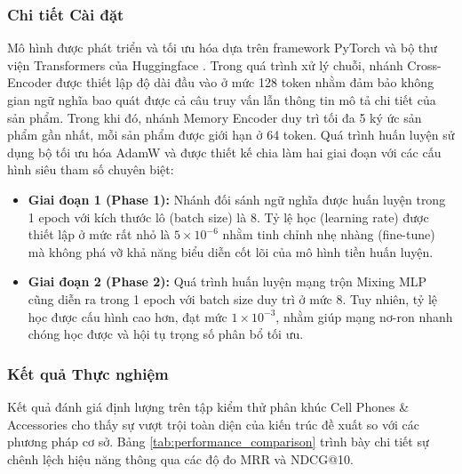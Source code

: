 \subsubsection*{Chi tiết Cài đặt}
Mô hình được phát triển và tối ưu hóa dựa trên framework PyTorch và bộ thư viện Transformers của Huggingface \cite{17}. Trong quá trình xử lý chuỗi, nhánh Cross-Encoder được thiết lập độ dài đầu vào ở mức 128 token nhằm đảm bảo không gian ngữ nghĩa bao quát được cả câu truy vấn lẫn thông tin mô tả chi tiết của sản phẩm. Trong khi đó, nhánh Memory Encoder duy trì tối đa 5 ký ức sản phẩm gần nhất, mỗi sản phẩm được giới hạn ở 64 token. Quá trình huấn luyện sử dụng bộ tối ưu hóa AdamW và được thiết kế chia làm hai giai đoạn với các cấu hình siêu tham số chuyên biệt:
\begin{itemize}
    \item \textbf{Giai đoạn 1 (Phase 1):} Nhánh đối sánh ngữ nghĩa được huấn luyện trong 1 epoch với kích thước lô (batch size) là 8. Tỷ lệ học (learning rate) được thiết lập ở mức rất nhỏ là $5 \times 10^{-6}$ nhằm tinh chỉnh nhẹ nhàng (fine-tune) mà không phá vỡ khả năng biểu diễn cốt lõi của mô hình tiền huấn luyện.
    \item \textbf{Giai đoạn 2 (Phase 2):} Quá trình huấn luyện mạng trộn Mixing MLP cũng diễn ra trong 1 epoch với batch size duy trì ở mức 8. Tuy nhiên, tỷ lệ học được cấu hình cao hơn, đạt mức $1 \times 10^{-3}$, nhằm giúp mạng nơ-ron nhanh chóng học được và hội tụ trọng số phân bổ tối ưu.
\end{itemize}

\subsubsection*{Kết quả Thực nghiệm}

Kết quả đánh giá định lượng trên tập kiểm thử phân khúc Cell Phones \& Accessories cho thấy sự vượt trội toàn diện của kiến trúc đề xuất so với các phương pháp cơ sở. Bảng \ref{tab:performance_comparison} trình bày chi tiết sự chênh lệch hiệu năng thông qua các độ đo MRR và NDCG@10.

